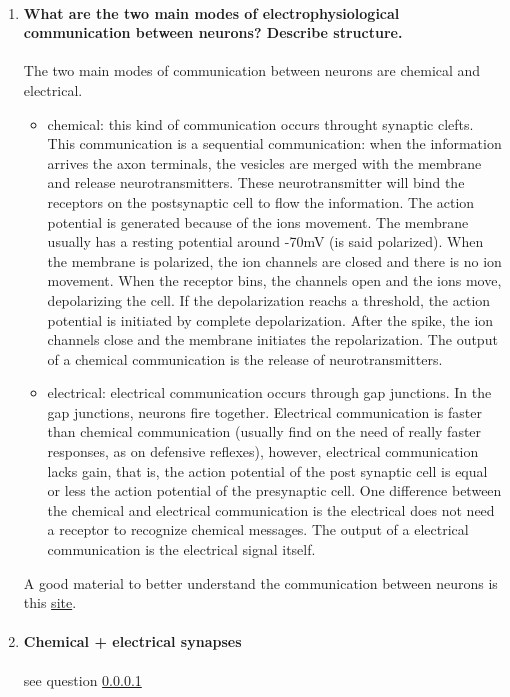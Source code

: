 \documentclass[12pt,article,oneside,a4paper]{memoir}
\begin{document}
\begin{enumerate}
\item \paragraph{What are the two main modes of electrophysiological communication between neurons? Describe structure.}\label{question:synaptic-communication}
The two main modes of communication between neurons are chemical and electrical.
\begin{itemize}
\item chemical: this kind of communication occurs throught synaptic clefts. This communication is a sequential communication: when the information arrives the axon terminals, the vesicles are merged with the membrane and release neurotransmitters. These neurotransmitter will bind the receptors on the postsynaptic cell to flow the information. The action potential is generated because of the ions movement. The membrane usually has a resting potential around -70mV (is said polarized). When the membrane is polarized, the ion channels are closed and there is no ion movement. When the receptor bins, the channels open and the ions move, depolarizing the cell. If the depolarization reachs a threshold, the action potential is initiated by complete depolarization. After the spike, the ion channels close and the membrane initiates the repolarization. The output of a chemical communication is the release of neurotransmitters.
\item electrical: electrical communication occurs through gap junctions. In the gap junctions, neurons fire together. Electrical communication is faster than chemical communication (usually find on the need of really faster responses, as on defensive reflexes), however, electrical communication lacks gain, that is, the action potential of the post synaptic cell is equal or less the action potential of the presynaptic cell. One difference between the chemical and electrical communication is the electrical does not need a receptor to recognize chemical messages. The output of a electrical communication is the electrical signal itself.
\end{itemize}

A good material to better understand the communication between neurons is this \href{http://www.mind.ilstu.edu/curriculum/neurons_intro/neurons_intro.php}{site}.

\item \paragraph{Chemical + electrical synapses}
see question \ref{question:synaptic-communication}

\end{enumerate}
\end{document}
